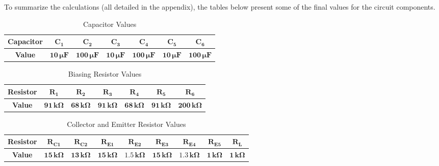 
{To summarize the calculations (all detailed in the appendix), the tables below present some of the final values for the circuit components.}

\begin{table}[H]
\centering
\begin{tabular}{|c|c|c|c|c|c|c|}
\hline\hline
\textbf{Capacitor} & \(\mathbf{C_1}\) & \(\mathbf{C_2}\) & \(\mathbf{C_3}\) & \(\mathbf{C_4}\) & \(\mathbf{C_5}\) & \(\mathbf{C_6}\) \\ \hline\hline
\textbf{Value} & \(\mathbf{10 \, \mu F}\) & \(\mathbf{100 \, \mu F}\) & \(\mathbf{10 \, \mu F}\) & \(\mathbf{100 \, \mu F}\) & \(\mathbf{10 \, \mu F}\) & \(\mathbf{100 \, \mu F}\) \\ \hline\hline
\end{tabular}
\caption{Capacitor Values}
\label{table:capacitor_values}
\end{table}

\begin{table}[H]
\centering
\begin{tabular}{|c|c|c|c|c|c|c|}
\hline\hline
\textbf{Resistor} & \(\mathbf{R_1}\) & \(\mathbf{R_2}\) & \(\mathbf{R_3}\) & \(\mathbf{R_4}\) & \(\mathbf{R_5}\) & \(\mathbf{R_6}\) \\ \hline\hline
\textbf{Value} & \(\mathbf{91 \, k\Omega}\) & \(\mathbf{68 \, k\Omega}\) & \(\mathbf{91 \, k\Omega}\) & \(\mathbf{68 \, k\Omega}\) & \(\mathbf{91 \, k\Omega}\) & \(\mathbf{200 \, k\Omega}\) \\ \hline\hline
\end{tabular}
\caption{Biasing Resistor Values}
\label{table:biasing_resistors}
\end{table}

\begin{table}[H]
\centering
\begin{tabular}{|c|c|c|c|c|c|c|c|c|}
\hline\hline
\textbf{Resistor} & \(\mathbf{R_{C1}}\) & \(\mathbf{R_{C2}}\) & \(\mathbf{R_{E1}}\) & \(\mathbf{R_{E2}}\) & \(\mathbf{R_{E3}}\) & \(\mathbf{R_{E4}}\) & \(\mathbf{R_{E5}}\) & \(\mathbf{R_L}\) \\ \hline\hline
\textbf{Value} & \(\mathbf{15 \, k\Omega}\) & \(\mathbf{13 \, k\Omega}\) & \(\mathbf{15 \, k\Omega}\) & \(\mathbf{1.5 \, k\Omega}\) & \(\mathbf{15 \, k\Omega}\) & \(\mathbf{1.3 \, k\Omega}\) & \(\mathbf{1 \, k\Omega}\) & \(\mathbf{1 \, k\Omega}\) \\ \hline\hline
\end{tabular}
\caption{Collector and Emitter Resistor Values}
\label{table:collector_emitter_resistors}
\end{table}

